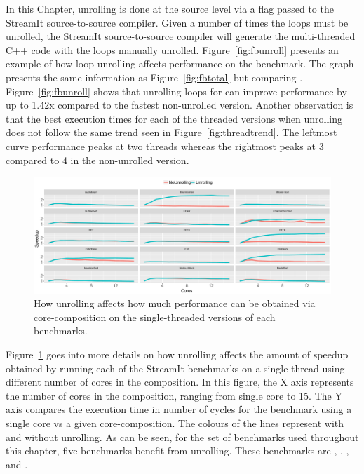 In this Chapter, unrolling is done at the source level via a flag passed to the StreamIt source-to-source compiler.
Given a number of times the loops must be unrolled, the StreamIt source-to-source compiler will generate the multi-threaded C++ code with the loops manually unrolled.
Figure~\ref{fig:fbunroll} presents an example of how loop unrolling affects performance on the  benchmark.
The graph presents the same information as Figure~\ref{fig:fbtotal} but comparing .
Figure~\ref{fig:fbunroll} shows that unrolling loops for  can improve performance by up to 1.42x compared to the fastest non-unrolled version.
Another observation is that the best execution times for each of the threaded versions when unrolling does not follow the same trend seen in Figure~\ref{fig:threadtrend}.
The leftmost curve performance peaks at two threads whereas the rightmost peaks at 3 compared to 4 in the non-unrolled version.

\begin{figure}[t]
  \includegraphics[width=1\textwidth]{streamit-paper/graphics/unrolling_vs_no_single_core.pdf}
  \caption{How unrolling affects how much performance can be obtained via core-composition on the single-threaded versions of each benchmarks.}\label{fig:unroll_summary}
\end{figure}

Figure~\ref{fig:unroll_summary} goes into more details on how unrolling affects the amount of speedup obtained by running each of the StreamIt benchmarks on a single thread using different number of cores in the composition.
In this figure, the X axis represents the number of cores in the composition, ranging from single core to 15.
The Y axis compares the execution time in number of cycles for the benchmark using a single core vs a given core-composition.
The colours of the lines represent with and without unrolling.
As can be seen, for the set of benchmarks used throughout this chapter, five benchmarks benefit from unrolling.
These benchmarks are , , ,  and . 

